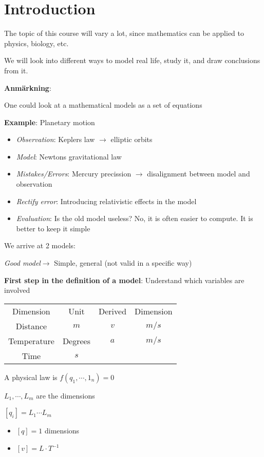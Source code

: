 \section{Introduction}\par
\noindent The topic of this course will vary a lot, since mathematics can be applied to physics, biology, etc.\par
\noindent We will look into different ways to model real life, study it, and draw conclusions from it.
\par\bigskip
\noindent\textbf{Anmärkning}:\par
\noindent One could look at a mathematical models as a set of equations
\par\bigskip
\noindent\textbf{Example}: Planetary motion
\begin{itemize}
  \item\textit{Observation}: Keplers law $\rightarrow$ elliptic orbits
  \item\textit{Model}: Newtons gravitational law
  \item\textit{Mistakes/Errors}: Mercury precission $\rightarrow$ disalignment between model and observation
  \item\textit{Rectify error}: Introducing relativistic effects in the model
  \item\textit{Evaluation}: Is the old model useless? No, it is often easier to compute. It is better to keep it simple 
\end{itemize}\par
\noindent We arrive at 2 models:
\begin{center}
  \textit{Good model}$\rightarrow$ Simple, general (not valid in a specific way)
\end{center}
\par\bigskip
\noindent\textbf{First step in the definition of a model}: Understand which variables are involved
\par\bigskip
\begin{center}
  \begin{tabular}{c|c|c|c}
    Dimension&Unit&Derived&Dimension\\
    Distance&$m$&$v$&$m/s$\\
    Temperature&Degrees&$a$&$m/s$\\
    Time&$s$&&
  \end{tabular}
\end{center}
\par\bigskip
\begin{theo}{}
  A physical law is $f(q_1,\cdots,1_n) = 0$
  \par\bigskip
  \noindent $L_1,\cdots, L_m$ are the dimensions\par
  \noindent $[q_i] = L_1\cdots L_m$
  \par\bigskip
  \begin{itemize}
    \item $[q] = 1$ dimensions
    \item $[v] = L\cdot T^{-1}$
  \end{itemize}
\end{theo}
